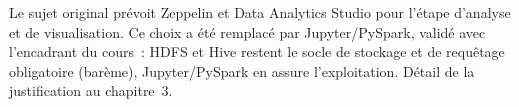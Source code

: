 \begin{constat}
Le sujet original prévoit Zeppelin et Data Analytics Studio pour
l'étape d'analyse et de visualisation. Ce choix a été remplacé par
Jupyter/PySpark, validé avec l'encadrant du cours~: HDFS et Hive restent le socle
de stockage et de requêtage obligatoire (barème), Jupyter/PySpark en
assure l'exploitation. Détail de la justification au chapitre~3.
\end{constat}
